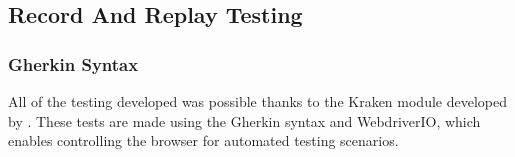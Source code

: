     






\subsection{Record And Replay Testing}


\subsubsection{Gherkin Syntax}

All of the testing developed was possible thanks to the Kraken module developed by \cite{art:kraken-2023}. These tests are made using the Gherkin syntax and WebdriverIO, which enables controlling the browser for automated testing scenarios.



